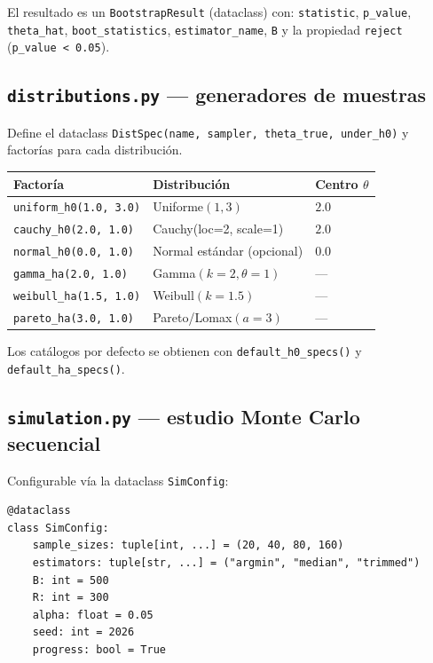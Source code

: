 \documentclass[11pt,a4paper]{article}
\begin{document}
El resultado es un \texttt{BootstrapResult} (dataclass) con: \texttt{statistic}, \texttt{p\_value}, \texttt{theta\_hat}, \texttt{boot\_statistics}, \texttt{estimator\_name}, \texttt{B} y la propiedad \texttt{reject} (\texttt{p\_value < 0.05}).

\subsection{\texttt{distributions.py} --- generadores de muestras}

Define el dataclass \texttt{DistSpec(name, sampler, theta\_true, under\_h0)} y factorías para cada distribución.

\begin{center}
\small
\begin{tabular}{@{}lll@{}}
\toprule
Factoría & Distribución & Centro $\theta$ \\
\midrule
\texttt{uniform\_h0(1.0, 3.0)} & Uniforme$(1,3)$ & $2.0$ \\
\texttt{cauchy\_h0(2.0, 1.0)} & Cauchy(loc=2, scale=1) & $2.0$ \\
\texttt{normal\_h0(0.0, 1.0)} & Normal estándar (opcional) & $0.0$ \\
\texttt{gamma\_ha(2.0, 1.0)} & Gamma$(k{=}2, \theta{=}1)$ & --- \\
\texttt{weibull\_ha(1.5, 1.0)} & Weibull$(k{=}1.5)$ & --- \\
\texttt{pareto\_ha(3.0, 1.0)} & Pareto/Lomax$(a{=}3)$ & --- \\
\bottomrule
\end{tabular}
\end{center}

Los catálogos por defecto se obtienen con \texttt{default\_h0\_specs()} y \texttt{default\_ha\_specs()}.

\subsection{\texttt{simulation.py} --- estudio Monte Carlo secuencial}

Configurable vía la dataclass \texttt{SimConfig}:
\begin{lstlisting}[style=pystyle]
@dataclass
class SimConfig:
    sample_sizes: tuple[int, ...] = (20, 40, 80, 160)
    estimators: tuple[str, ...] = ("argmin", "median", "trimmed")
    B: int = 500
    R: int = 300
    alpha: float = 0.05
    seed: int = 2026
    progress: bool = True
\end{lstlisting}
\end{document}
